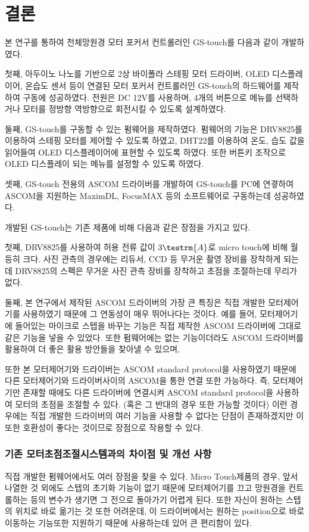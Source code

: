 \section{결론}
	
본 연구를 통하여 천체망원경 모터 포커서 컨트롤러인 GS-touch를 다음과 같이 개발하였다. 

첫째, 아두이노 나노를 기반으로 2상 바이폴라 스테핑 모터 드라이버, OLED 디스플레이어, 온습도 센서 등이 연결된 모터 포커서 컨트롤러인 GS-touch의 하드웨어를 제작하여 구동에 성공하였다. 전원은 DC 12V를 사용하며, 4개의 버튼으로 메뉴를 선택하거나 모터를 정방향 역방향으로 회전시킬 수 있도록 설계하였다.

둘째, GS-touch를 구동할 수 있는 펌웨어을 제작하였다. 펌웨어의 기능은 DRV8825를 이용하여 스테핑 모터를 제어할 수 있도록 하였고, DHT22를 이용하여 온도, 습도 값을 읽어들여 OLED 디스플레이어에 표현할 수 있도록 하였다. 또한 버튼키 조작으로 OLED 디스플레이 되는 메뉴를 설정할 수 있도록 하였다. 

셋째, GS-touch 전용의 ASCOM 드라이버를 개발하여 GS-touch를 PC에 연곃하여 ASCOM을 지원하는 MaximDL, FocusMAX 등의 소프트웨어로 구동하는데 성공하였다.

개발된 GS-touch는 기존 제품에 비해 다음과 같은 장점을 가지고 있다. 

첫째, DRV8825를 사용하여 허용 전류 값이 $3 \testrm{A}$로 micro touch에 비해 월등히 크다. 사진 관측의 경우에는 리듀서, CCD 등 무거운 촬영 장비를 장착하게 되는데 DRV8825의 스펙은 무거운 사진 관측 장비를 장착하고 초점을 조절하는데 무리가 없다.

둘째, 본 연구에서 제작된 ASCOM 드라이버의 가장 큰 특징은 직접 개발한 모터제어기를 사용하였기 때문에 그 연동성이 매우 뛰어나다는 것이다. 예를 들어, 모터제어기에 들어있는 마이크로 스텝을 바꾸는 기능은 직접 제작한 ASCOM 드라이버에 그대로 같은 기능을 넣을 수 있었다. 또한 펌웨어에는 없는 기능이더라도 ASCOM 드라이버를 활용하여 더 좋은 활용 방안들을 찾아낼 수 있으며, 

또한 본 모터제어기와 드라이버는 ASCOM standard protocol을 사용하였기 때문에 다른 모터제어기와 드라이버사이의 ASCOM을 통한 연결 또한 가능하다. 즉, 모터제어기만 존재할 때에도 다른 드라이버에 연결시켜 ASCOM standard protocol을 사용하여 모터의 초점을 조절할 수 있다. (혹은 그 반대의 경우 또한 가능할 것이다) 이런 경우에는 직접 개발한 드라이버의 여러 기능을 사용할 수 없다는 단점이 존재하겠지만 이 또한 호환성이 좋다는 것이므로 장점으로 작용할 수 있다.

\subsubsection{기존 모터초점조절시스템과의 차이점 및 개선 사항}
직접 개발한 펌웨어에서도 여러 장점을 찾을 수 있다. Micro Touch제품의 경우, 앞서 나열한 것 외에도 스텝의 초기화 기능이 없기 때문에 모터제어기를 끄고 망원경을 컨트롤하는 등의 변수가 생기면 그 전으로 돌아가기 어렵게 된다. 또한 자신이 원하는 스텝의 위치로 바로 옮기는 것 또한 어려운데, 이 드라이버에서는 원하는 position으로 바로 이동하는 기능또한 지원하기 때문에 사용하는데 있어 큰 편리함이 있다. 

